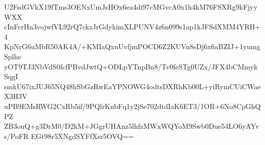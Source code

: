U2FsdGVkX19fTms3OENxUmJsHOx6ea4di97cMGvcA0x1h4kM76FSXRg9kFjyyWXX
cInFcrHn3vojwfVL92rQ7ckzJrGdykimXLPUNV4z6n099s1ap1kJFSdXMM4YRH+4
KpNrG6uMbR50AK4A/+KMIaQxuUvfjmPOCD6Z2KUVn8sDj6x6aBZIJ+1yumgSplhe
yOT9TJ3NbVdS0fcfPBvdJwtQ+ODLpYTnpBn8/Tv0feSTg0UZx/JFX4bCMmykSqgI
smkU67ixJUJ65NQ48hSbGzRwEaYPNOWG4odtsDXRhKb00L+yiRymCUiCWaeX3H3V
uPB9EMsRWG2CxRb5if/9PQlrKnbFq1y2jSe702dtdIaK6ET3/1OR+6No8CpGhQPZ
ZB3ouQ+g3DrM0/D2kM+JGgrUHAnz5lhfzMWxWQYoM9Swb0Due54LO6yAYvs/PoFR
EGt98r5XNgdSYFfXsr5OVQ==
